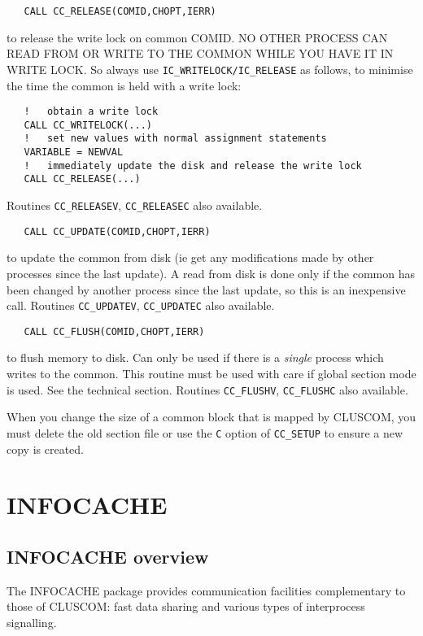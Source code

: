 \begin{verbatim}
   CALL CC_RELEASE(COMID,CHOPT,IERR)
\end{verbatim}
   to release the write lock on common COMID. NO OTHER PROCESS
   CAN READ FROM OR WRITE TO THE COMMON WHILE YOU HAVE IT IN
   WRITE LOCK. So always use \verb|IC_WRITELOCK/IC_RELEASE| as follows, to
   minimise the time the common is held with a write lock:
\begin{verbatim}
   !   obtain a write lock
   CALL CC_WRITELOCK(...)
   !   set new values with normal assignment statements
   VARIABLE = NEWVAL
   !   immediately update the disk and release the write lock
   CALL CC_RELEASE(...)
\end{verbatim}
   Routines \verb|CC_RELEASEV|, \verb|CC_RELEASEC| also available.

\begin{verbatim}
   CALL CC_UPDATE(COMID,CHOPT,IERR)
\end{verbatim}
   to update the common from disk (ie get any modifications made
   by other processes since the last update). A read
   from disk is done only if the common has been changed by
   another process since the last update, so this is an
   inexpensive call.
   Routines \verb|CC_UPDATEV|, \verb|CC_UPDATEC| also available.

\begin{verbatim}
   CALL CC_FLUSH(COMID,CHOPT,IERR)
\end{verbatim}
   to flush memory to disk. Can only be used if there is a
   {\em single\/} process which writes to the common.
   This routine must be used with care
   if global section mode is used. See the technical section.
   Routines \verb|CC_FLUSHV|, \verb|CC_FLUSHC| also available.


When you change the size of a common block that is mapped by CLUSCOM,
you must delete the old section file or use the
{\tt C} option of \verb|CC_SETUP| to ensure a new copy is created.

\section{INFOCACHE}

\subsection{INFOCACHE overview}
The INFOCACHE package provides communication facilities complementary
to those of CLUSCOM: fast data sharing and various types of
interprocess signalling.

